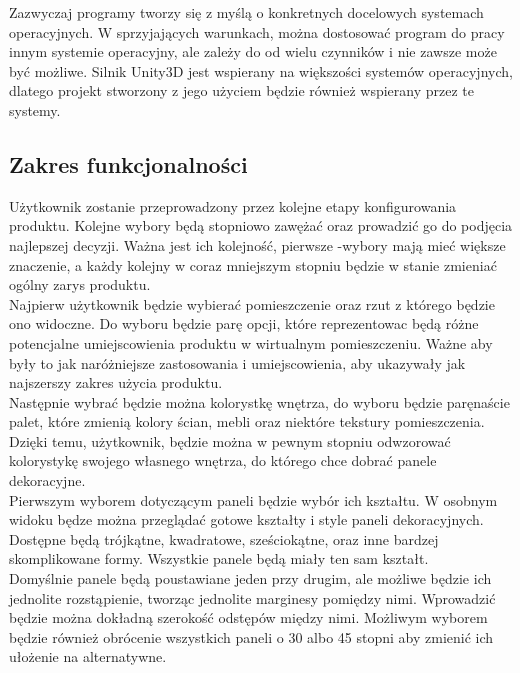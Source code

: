 \documentclass{article} %
\begin{document}
        Zazwyczaj programy tworzy się z myślą o konkretnych docelowych systemach operacyjnych. W sprzyjających warunkach, można dostosować program do pracy innym systemie operacyjny, ale zależy do od wielu czynników i nie zawsze może być możliwe. Silnik Unity3D jest wspierany na większości systemów operacyjnych, dlatego projekt stworzony z jego użyciem będzie również wspierany przez te systemy.
        \\
        
        
    \subsection{Zakres funkcjonalności}
        Użytkownik zostanie przeprowadzony przez kolejne etapy konfigurowania produktu. Kolejne wybory będą stopniowo zawężać oraz prowadzić go do podjęcia najlepszej decyzji. Ważna jest ich kolejność, pierwsze -wybory mają mieć większe znaczenie, a każdy kolejny w coraz mniejszym stopniu będzie w stanie zmieniać ogólny zarys produktu.
        \\
        
        Najpierw użytkownik będzie wybierać pomieszczenie oraz rzut z którego będzie ono widoczne. Do wyboru będzie parę opcji, które reprezentowac będą różne potencjalne umiejscowienia produktu w wirtualnym pomieszczeniu. Ważne aby były to jak naróżniejsze zastosowania i umiejscowienia, aby ukazywały jak najszerszy zakres użycia produktu. 
        \\
        
        Następnie wybrać będzie można kolorystkę wnętrza, do wyboru będzie paręnaście palet, które zmienią kolory ścian, mebli oraz niektóre tekstury pomieszczenia. Dzięki temu, użytkownik, będzie można w pewnym stopniu odwzorować kolorystykę swojego własnego wnętrza, do którego chce dobrać panele dekoracyjne.
        \\
        
        Pierwszym wyborem dotyczącym paneli będzie wybór ich kształtu. W osobnym widoku będze można przeglądać gotowe kształty i style paneli dekoracyjnych. Dostępne będą trójkątne, kwadratowe, sześciokątne, oraz inne bardzej skomplikowane formy. Wszystkie panele będą miały ten sam kształt.
        \\
        
        Domyślnie panele będą poustawiane jeden przy drugim, ale możliwe będzie ich jednolite rozstąpienie, tworząc jednolite marginesy pomiędzy nimi. Wprowadzić będzie można dokładną szerokość odstępów między nimi. Możliwym wyborem będzie również obrócenie wszystkich paneli o 30 albo 45 stopni aby zmienić ich ułożenie na alternatywne.
        \\
        
\end{document}
